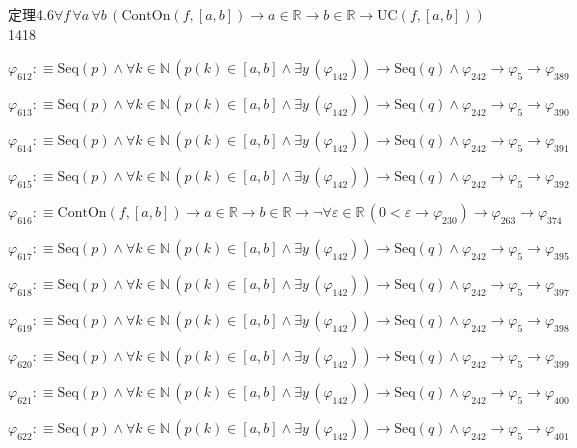 \begin{fullproof}{定理4.6}{$\forall f\,\forall a\,\forall b\,(\mathrm{ContOn}(f,[a,b]) \to a \in \mathbb{R} \to b \in \mathbb{R} \to \mathrm{UC}(f,[a,b]))$}{1418}
\begin{abbrevlist}
\item $\varphi_{612} :\equiv \mathrm{Seq}(p) \land \forall k \in \mathbb{N}\,(p(k) \in [a,b] \land \exists y\,(\varphi_{142})) \to \mathrm{Seq}(q) \land \varphi_{242} \to \varphi_{5} \to \varphi_{389}$
\item $\varphi_{613} :\equiv \mathrm{Seq}(p) \land \forall k \in \mathbb{N}\,(p(k) \in [a,b] \land \exists y\,(\varphi_{142})) \to \mathrm{Seq}(q) \land \varphi_{242} \to \varphi_{5} \to \varphi_{390}$
\item $\varphi_{614} :\equiv \mathrm{Seq}(p) \land \forall k \in \mathbb{N}\,(p(k) \in [a,b] \land \exists y\,(\varphi_{142})) \to \mathrm{Seq}(q) \land \varphi_{242} \to \varphi_{5} \to \varphi_{391}$
\item $\varphi_{615} :\equiv \mathrm{Seq}(p) \land \forall k \in \mathbb{N}\,(p(k) \in [a,b] \land \exists y\,(\varphi_{142})) \to \mathrm{Seq}(q) \land \varphi_{242} \to \varphi_{5} \to \varphi_{392}$
\item $\varphi_{616} :\equiv \mathrm{ContOn}(f,[a,b]) \to a \in \mathbb{R} \to b \in \mathbb{R} \to \neg \forall \varepsilon \in \mathbb{R}\,(0 < \varepsilon \to \varphi_{230}) \to \varphi_{263} \to \varphi_{374}$
\item $\varphi_{617} :\equiv \mathrm{Seq}(p) \land \forall k \in \mathbb{N}\,(p(k) \in [a,b] \land \exists y\,(\varphi_{142})) \to \mathrm{Seq}(q) \land \varphi_{242} \to \varphi_{5} \to \varphi_{395}$
\item $\varphi_{618} :\equiv \mathrm{Seq}(p) \land \forall k \in \mathbb{N}\,(p(k) \in [a,b] \land \exists y\,(\varphi_{142})) \to \mathrm{Seq}(q) \land \varphi_{242} \to \varphi_{5} \to \varphi_{397}$
\item $\varphi_{619} :\equiv \mathrm{Seq}(p) \land \forall k \in \mathbb{N}\,(p(k) \in [a,b] \land \exists y\,(\varphi_{142})) \to \mathrm{Seq}(q) \land \varphi_{242} \to \varphi_{5} \to \varphi_{398}$
\item $\varphi_{620} :\equiv \mathrm{Seq}(p) \land \forall k \in \mathbb{N}\,(p(k) \in [a,b] \land \exists y\,(\varphi_{142})) \to \mathrm{Seq}(q) \land \varphi_{242} \to \varphi_{5} \to \varphi_{399}$
\item $\varphi_{621} :\equiv \mathrm{Seq}(p) \land \forall k \in \mathbb{N}\,(p(k) \in [a,b] \land \exists y\,(\varphi_{142})) \to \mathrm{Seq}(q) \land \varphi_{242} \to \varphi_{5} \to \varphi_{400}$
\item $\varphi_{622} :\equiv \mathrm{Seq}(p) \land \forall k \in \mathbb{N}\,(p(k) \in [a,b] \land \exists y\,(\varphi_{142})) \to \mathrm{Seq}(q) \land \varphi_{242} \to \varphi_{5} \to \varphi_{401}$

\end{abbrevlist}
\end{fullproof}
